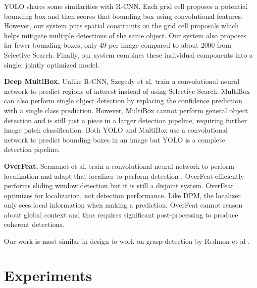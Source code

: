 \documentclass{article} %
\begin{document}
YOLO shares some similarities with R-CNN. Each grid cell proposes a potential bounding box and then scores that bounding box using convolutional features. However, our system puts spatial constraints on the grid cell proposals which helps mitigate multiple detections of the same object. Our system also proposes far fewer bounding boxes, only 49 per image compared to about 2000 from Selective Search. Finally, our system combines these individual components into a single, jointly optimized model.

\textbf{Deep MultiBox.} Unlike R-CNN, Szegedy et al. train a convolutional neural network to predict regions of interest \cite{erhan2014scalable} instead of using Selective Search. MultiBox can also perform single object detection by replacing the confidence prediction with a single class prediction. However, MultiBox cannot perform general object detection and is still just a piece in a larger detection pipeline, requiring further image patch classification. Both YOLO and MultiBox use a convolutional network to predict bounding boxes in an image but YOLO is a complete detection pipeline.

\textbf{OverFeat.} Sermanet et al. train a convolutional neural network to perform localization and adapt that localizer to perform detection \cite{DBLP:journals/corr/SermanetEZMFL13}. OverFeat efficiently performs sliding window detection but it is still a disjoint system. OverFeat optimizes for localization, not detection performance. Like DPM, the localizer only sees local information when making a prediction. OverFeat cannot reason about global context and thus requires significant post-processing to produce coherent detections.

Our work is most similar in design to work on grasp detection by Redmon et al \cite{DBLP:journals/corr/RedmonA14}.

\section{Experiments}
\end{document}
